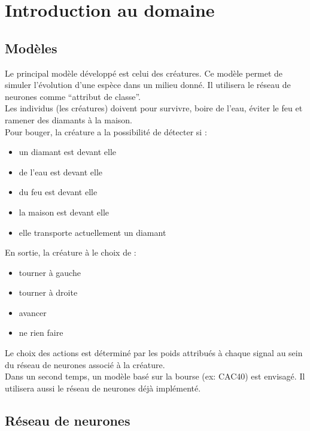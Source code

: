 \chapter{Introduction au domaine}

\section{Modèles}
Le principal modèle développé est celui des créatures.
Ce modèle permet de simuler l'évolution d'une espèce dans un milieu donné.
Il utilisera le réseau de neurones comme ``attribut de classe''.\\
Les individus (les créatures) doivent pour survivre, boire de l'eau, éviter le feu et ramener des diamants à la maison.
\\Pour bouger, la créature a la possibilité de détecter si :\\

\begin{itemize}
 \item un diamant est devant elle
 \item de l'eau est devant elle
 \item du feu est devant elle
 \item la maison est devant elle
 \item elle transporte actuellement un diamant\\
\end{itemize}

En sortie, la créature à le choix de :
\begin{itemize}
 \item tourner à gauche
 \item tourner à droite
 \item avancer
 \item ne rien faire\\
 
\end{itemize}
 
Le choix des actions est déterminé par les poids attribués à chaque signal au sein du réseau de neurones associé à la créature.\\

Dans un second temps, un modèle basé sur la bourse (ex: CAC40) est envisagé.
Il utilisera aussi le réseau de neurones déjà implémenté.
\clearpage




\section{Réseau de neurones}


